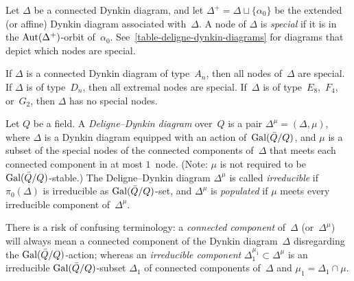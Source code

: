 \documentclass[10pt,twoside,leqno]{article}
\numberwithin{equation}{subsection}
\newcommand{\Aut}{\textnormal{Aut}}
\newcommand{\Gal}{\textnormal{Gal}}
\begin{document}
\begin{definition} %
 \label{special-node}
 Let $\Delta$ be a connected Dynkin diagram, and
 let $\Delta^+ = \Delta \sqcup \{\alpha_0\}$ be the extended (or affine)
 Dynkin diagram associated with~$\Delta$.
 A node of $\Delta$ is \emph{special}
 if it is in the $\Aut(\Delta^+)$-orbit of~$\alpha_0$.
 See~\cref{table-deligne-dynkin-diagrams}
 for diagrams that depict which nodes are special.
\end{definition}

\begin{example} %
 If $\Delta$ is a connected Dynkin diagram of type~$A_n$,
 then all nodes of~$\Delta$ are special.
 If $\Delta$ is of type~$D_n$, then all extremal nodes are special.
 If~$\Delta$ is of type~$E_8$,~$F_4$, or~$G_2$,
 then $\Delta$ has no special nodes.
\end{example}

\begin{definition} %
 \label{deligne-dynkin-diagram}
 Let $Q$ be a field.
 A \emph{Deligne--Dynkin diagram} over~$Q$
 is a pair $\Delta^\mu = (\Delta, \mu)$, where
 $\Delta$ is a Dynkin diagram equipped with an action of~$\Gal(\bar Q/Q)$,
 and $\mu$ is a subset of the special nodes
 of the connected components of~$\Delta$
 that meets each connected component in at most $1$~node.
 (Note: $\mu$ is not required to be $\Gal(\bar Q/Q)$-stable.)
 The Deligne--Dynkin diagram $\Delta^\mu$ is called \emph{irreducible}
 if $\pi_0(\Delta)$ is irreducible as $\Gal(\bar Q/Q)$-set,
 and $\Delta^\mu$ is \emph{populated} if $\mu$ meets every
 irreducible component of~$\Delta^\mu$.
\end{definition}

\begin{remark} %
 There is a risk of confusing terminology:
 a \emph{connected component} of~$\Delta$ (or~$\Delta^\mu$)
 will always mean a connected component of the Dynkin diagram~$\Delta$
 disregarding the $\Gal(\bar Q/Q)$-action;
 whereas an \emph{irreducible component} $\Delta_1^{\mu_1} \subset \Delta^\mu$
 is an irreducible $\Gal(\bar Q/Q)$-subset $\Delta_1$
 of connected components of~$\Delta$ and $\mu_1 = \Delta_1 \cap \mu$.
\end{remark}
\end{document}
